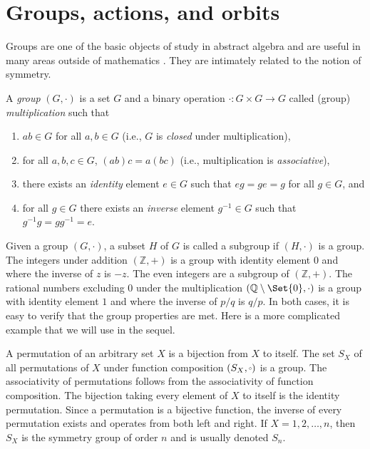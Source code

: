 \chapter{\label{app:def}Groups, actions, and orbits}
\setcounter{example}{0}

Groups are one of the basic objects of study in abstract algebra and
are useful in many areas outside of mathematics \cite{armstrong1997groups, dummit2003abstract}.  They are intimately
related to the notion of symmetry.

\begin{definition}
A \emph{group} $(G, \cdot)$ is a set $G$ and a binary operation $\cdot: G \times G \to G$
called (group) \emph{multiplication} such that
\begin{enumerate}
\item $ab \in G$ for all $a, b \in G$ (i.e., $G$ is \emph{closed} under multiplication),
\item for all $a, b, c \in G$, $(ab)c = a(bc)$ (i.e., multiplication is \emph{associative}),
\item there exists an \emph{identity} element $e \in G$ such that $eg = ge = g$ for all $g \in G$, and
\item for all $g \in G$ there exists an \emph{inverse} element $g^{-1} \in G$ such that $g^{-1}g = gg^{-1} = e$.
\end{enumerate}
\end{definition}

Given a group $(G, \cdot)$, a subset $H$ of $G$ is called a subgroup if 
$(H, \cdot)$ is a group.  The integers under addition $(\mathbb{Z}, +)$ is a group
with identity element $0$ and where the inverse of $z$ is $-z$.  The even
integers are a subgroup of $(\mathbb{Z}, +)$.  The rational numbers excluding
$0$ under the multiplication $(\mathbb{Q}\setminus \Set{0}, \cdot)$ is a group
with identity element $1$ and where the inverse of $p/q$ is $q/p$. In both
cases, it is easy to verify that the group properties are met.  Here is a more
complicated example that we will use in the sequel. 

\begin{example}
A permutation of an arbitrary set $X$ is a bijection from $X$ to itself.  The
set $S_X$ of all permutations of $X$ under function composition
$(S_X, \smallcirc)$ is a group.  The associativity of permutations follows from the
associativity of function composition.  The bijection taking every element of
$X$ to itself is the identity permutation. Since a permutation is a bijective function, the
inverse of every permutation exists and operates from both left and right.  
If $X = {1, 2, \dots, n}$, then $S_X$ is the symmetry group of order $n$
and is usually denoted $S_n$.
\end{example}


